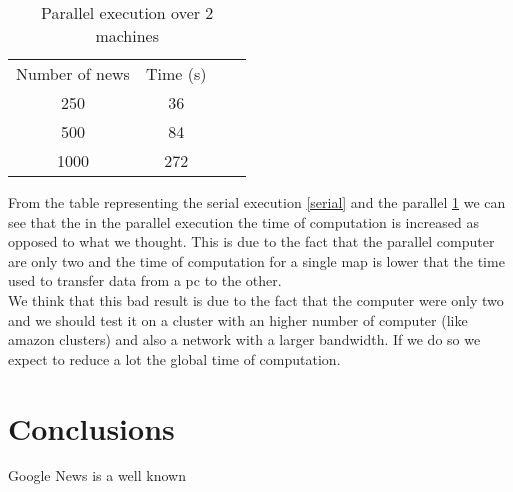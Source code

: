 \documentclass{acm_proc_article-sp}
\begin{document}
\begin{table}[!ht]
\centering
\label{parallel}
\begin{tabular}{cccc}
Number of news & Time (s) \\
250            & 36       \\
500            & 84       \\
1000           & 272      \\
\end{tabular}
\caption{Parallel execution over 2 machines}
\end{table}

From the table representing the serial execution \ref{serial} and the parallel \ref{parallel} we can see that the in the parallel execution the time of computation is increased as opposed to what we thought. This is due to the fact that the parallel computer are only two and the time of computation for a single map is lower that the time used to transfer data from a pc to the other. \\We think that this bad result is due to the fact that the computer were only two and we should test it on a cluster with an higher number of computer (like amazon clusters) and also a network with a larger bandwidth. If we do so we expect to reduce a lot the global time of computation.


\section{Conclusions}
Google News is a well known 




\balancecolumns
\end{document}
